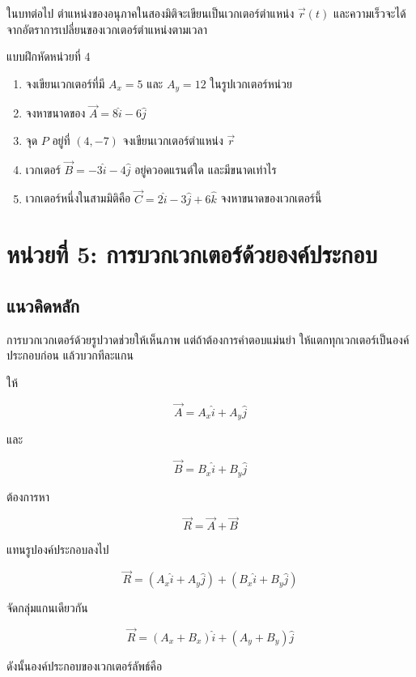 \documentclass[12pt,a4paper]{report}
\begin{document}
\begin{tcolorbox}[title=เชื่อมกับบทการเคลื่อนที่]
ในบทต่อไป ตำแหน่งของอนุภาคในสองมิติจะเขียนเป็นเวกเตอร์ตำแหน่ง $\vec{r}(t)$ และความเร็วจะได้จากอัตราการเปลี่ยนของเวกเตอร์ตำแหน่งตามเวลา
\end{tcolorbox}

\begin{exercisebox}{แบบฝึกหัดหน่วยที่ 4}
\begin{enumerate}
    \item จงเขียนเวกเตอร์ที่มี $A_x=5$ และ $A_y=12$ ในรูปเวกเตอร์หน่วย
    \item จงหาขนาดของ $\vec{A}=8\hat{i}-6\hat{j}$
    \item จุด $P$ อยู่ที่ $(4,-7)$ จงเขียนเวกเตอร์ตำแหน่ง $\vec{r}$
    \item เวกเตอร์ $\vec{B}=-3\hat{i}-4\hat{j}$ อยู่ควอดแรนต์ใด และมีขนาดเท่าไร
    \item เวกเตอร์หนึ่งในสามมิติคือ $\vec{C}=2\hat{i}-3\hat{j}+6\hat{k}$ จงหาขนาดของเวกเตอร์นี้
\end{enumerate}
\end{exercisebox}

\section{หน่วยที่ 5: การบวกเวกเตอร์ด้วยองค์ประกอบ}

\subsection{แนวคิดหลัก}

การบวกเวกเตอร์ด้วยรูปวาดช่วยให้เห็นภาพ แต่ถ้าต้องการคำตอบแม่นยำ ให้แตกทุกเวกเตอร์เป็นองค์ประกอบก่อน แล้วบวกทีละแกน

ให้

\[
\vec{A}=A_x\hat{i}+A_y\hat{j}
\]

และ

\[
\vec{B}=B_x\hat{i}+B_y\hat{j}
\]

ต้องการหา

\[
\vec{R}=\vec{A}+\vec{B}
\]

แทนรูปองค์ประกอบลงไป

\[
\vec{R}=(A_x\hat{i}+A_y\hat{j})+(B_x\hat{i}+B_y\hat{j})
\]

จัดกลุ่มแกนเดียวกัน

\[
\vec{R}=(A_x+B_x)\hat{i}+(A_y+B_y)\hat{j}
\]

ดังนั้นองค์ประกอบของเวกเตอร์ลัพธ์คือ
\end{document}
